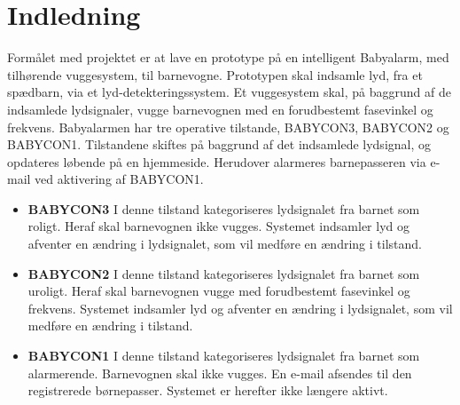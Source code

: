 \section{Indledning}

Formålet med projektet er at lave en prototype på en intelligent Babyalarm, med tilhørende vuggesystem, til barnevogne. Prototypen skal indsamle lyd, fra et spædbarn, via et lyd-detekteringssystem. Et vuggesystem skal, på baggrund af de indsamlede lydsignaler, vugge barnevognen med en forudbestemt fasevinkel og frekvens. Babyalarmen har tre operative tilstande, BABYCON3, BABYCON2 og BABYCON1. Tilstandene skiftes på baggrund af det indsamlede lydsignal, og opdateres løbende på en hjemmeside. Herudover alarmeres barnepasseren via e-mail ved aktivering af BABYCON1. 
\begin{itemize}
\item \textbf{BABYCON3} 
\newline I denne tilstand kategoriseres lydsignalet fra barnet som roligt. Heraf skal barnevognen ikke vugges. Systemet indsamler lyd og afventer en ændring i lydsignalet, som vil medføre en ændring i tilstand. 
\item \textbf{BABYCON2}
\newline I denne tilstand kategoriseres lydsignalet fra barnet som uroligt. Heraf skal barnevognen vugge med forudbestemt fasevinkel og frekvens. Systemet indsamler lyd og afventer en ændring i lydsignalet, som vil medføre en ændring i tilstand. 

\item \textbf{BABYCON1}
\newline I denne tilstand kategoriseres lydsignalet fra barnet som alarmerende. Barnevognen skal ikke vugges. En e-mail afsendes til den registrerede børnepasser. Systemet er herefter ikke længere aktivt. 
\end{itemize}
 

